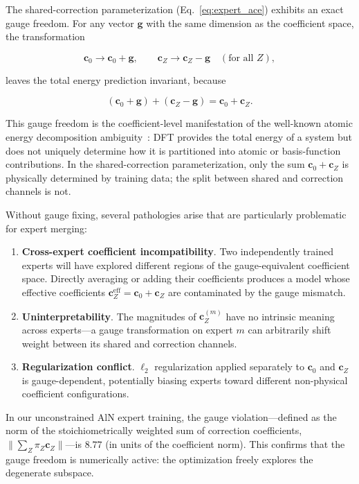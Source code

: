 \documentclass[twoside,prb,aps,floatfix,superscriptaddress,longbibliography]{revtex4-2}
\newcommand{\g}{\mathbf{g}}
\newcommand{\cZ}{\mathbf{c}_{Z}}
\newcommand{\cb}{\mathbf{c}_{0}}
\begin{document}
The shared-correction parameterization (Eq.~\eqref{eq:expert_ace}) exhibits an exact gauge freedom. For any vector $\g$ with the same dimension as the coefficient space, the transformation

\begin{equation}
\cb \to \cb + \g,
\qquad
\cZ \to \cZ - \g \quad (\text{for all } Z),
\label{eq:gauge_transform}
\end{equation}

leaves the total energy prediction invariant, because

\begin{equation}
(\cb + \g) + (\cZ - \g) = \cb + \cZ.
\label{eq:gauge_invariance}
\end{equation}

This gauge freedom is the coefficient-level manifestation of the well-known atomic energy decomposition ambiguity~\cite{Yoo2019AtomicEnergyMapping}: DFT provides the total energy of a system but does not uniquely determine how it is partitioned into atomic or basis-function contributions. In the shared-correction parameterization, only the sum $\cb + \cZ$ is physically determined by training data; the split between shared and correction channels is not.

Without gauge fixing, several pathologies arise that are particularly problematic for expert merging:
\begin{enumerate}[label=(\roman*)]
    \item \textbf{Cross-expert coefficient incompatibility}. Two independently trained experts will have explored different regions of the gauge-equivalent coefficient space. Directly averaging or adding their coefficients produces a model whose effective coefficients $\cZ^{\mathrm{eff}} = \cb + \cZ$ are contaminated by the gauge mismatch.
    \item \textbf{Uninterpretability}. The magnitudes of $\cZ^{(m)}$ have no intrinsic meaning across experts---a gauge transformation on expert $m$ can arbitrarily shift weight between its shared and correction channels.
    \item \textbf{Regularization conflict}. $\ell_2$ regularization applied separately to $\cb$ and $\cZ$ is gauge-dependent, potentially biasing experts toward different non-physical coefficient configurations.
\end{enumerate}

In our unconstrained AlN expert training, the gauge violation---defined as the norm of the stoichiometrically weighted sum of correction coefficients, $\lVert \sum_Z \pi_Z \cZ \rVert$---is $8.77$ (in units of the coefficient norm). This confirms that the gauge freedom is numerically active: the optimization freely explores the degenerate subspace.
\end{document}
